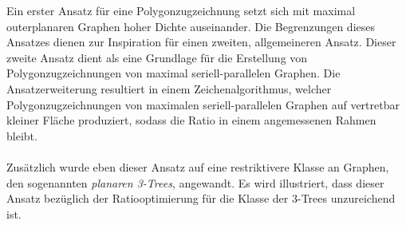 Ein erster Ansatz für eine Polygonzugzeichnung setzt sich mit maximal outerplanaren Graphen hoher Dichte auseinander. Die Begrenzungen dieses Ansatzes dienen zur Inspiration für einen zweiten, allgemeineren Ansatz. Dieser zweite Ansatz dient als eine Grundlage für die Erstellung von Polygonzugzeichnungen von maximal seriell-parallelen Graphen. Die Ansatzerweiterung resultiert in einem Zeichenalgorithmus, welcher Polygonzugzeichnungen von maximalen seriell-parallelen Graphen auf vertretbar kleiner Fläche produziert, sodass die Ratio in einem angemessenen Rahmen bleibt.\\\\
Zusätzlich wurde eben dieser Ansatz auf eine restriktivere Klasse an Graphen, den sogenannten \emph{planaren 3-Trees}, angewandt. Es wird illustriert, dass dieser Ansatz bezüglich der Ratiooptimierung für die Klasse der 3-Trees unzureichend ist.